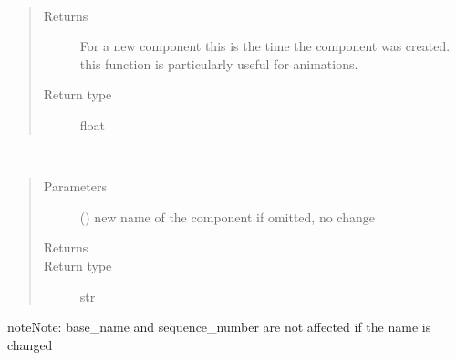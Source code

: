 \documentclass[letterpaper,10pt,english]{sphinxmanual}
\begin{document}
\begin{fulllineitems}
\begin{fulllineitems}
\begin{quote}
\begin{description}
\end{description}\end{quote}

\end{fulllineitems}


\begin{fulllineitems}
\label{\detokenize{Reference:salabim.Component.mode_time}}~\begin{quote}\begin{description}
\item[{Returns}] \leavevmode
{} \textendash{} For a new component this is
the time the component was created. 
this function is particularly useful for animations.

\item[{Return type}] \leavevmode
float

\end{description}\end{quote}

\end{fulllineitems}


\begin{fulllineitems}
\label{\detokenize{Reference:salabim.Component.name}}~\begin{quote}\begin{description}
\item[{Parameters}] \leavevmode
{} () \textendash{} new name of the component
if omitted, no change

\item[{Returns}] \leavevmode
{}

\item[{Return type}] \leavevmode
str

\end{description}\end{quote}

\begin{sphinxadmonition}{note}{Note:}
base\_name and sequence\_number are not affected if the name is changed
\end{sphinxadmonition}


\end{fulllineitems}
\end{fulllineitems}
\end{document}

